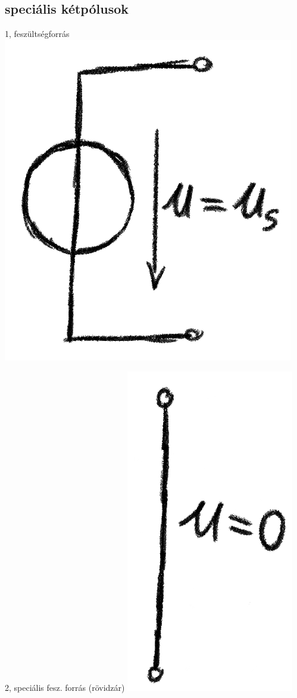 \documentclass[12pt]{article}
\begin{document}
         \subsection{speciális kétpólusok}

            1, feszültségforrás \includegraphics{img/2.png}

            2, speciális fesz. forrás (rövidzár) \includegraphics{img/3.png}
\end{document}
